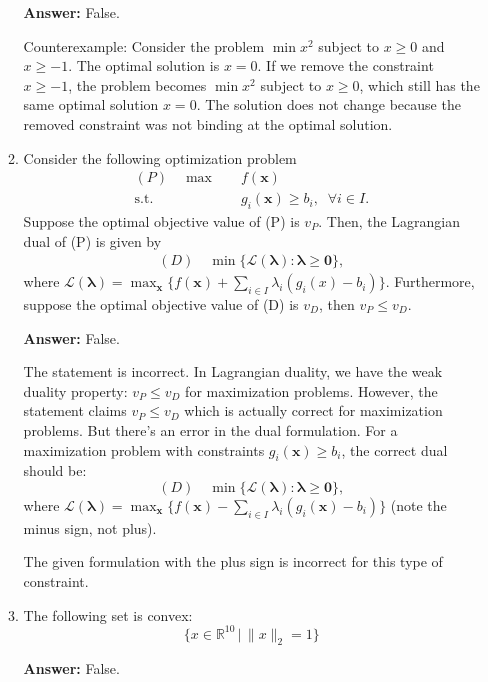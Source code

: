 \documentclass{article}
\def\x{\bm{x}}
\begin{document}
\begin{enumerate}
\begin{enumerate}
\textbf{Answer:} False.

Counterexample: Consider the problem $\min x^2$ subject to $x \geq 0$ and $x \geq -1$. The optimal solution is $x = 0$. If we remove the constraint $x \geq -1$, the problem becomes $\min x^2$ subject to $x \geq 0$, which still has the same optimal solution $x = 0$. The solution does not change because the removed constraint was not binding at the optimal solution.

\item Consider the following optimization problem
\begin{align*}
    (P)\quad \max \quad & f(\x) \\
    \text{s.t.}\quad & g_i(\x)\ge b_i, \;\; \forall i \in I.
\end{align*}
Suppose the optimal objective value of (P) is $v_P$. Then, the Lagrangian dual of (P) is given by
\begin{align}
    (D) \quad \min\{\mathcal{L}(\bm{\lambda}) : \bm{\lambda} \ge \bm{0}\},
\end{align}
where $\mathcal{L}(\bm{\lambda}) = \max_{\x}\{f(\x) + \sum_{i\in I}\lambda_i(g_i(x)-b_i)\}$. Furthermore, suppose the optimal objective value of (D) is $v_D$, then $v_P \le v_D$.

\textbf{Answer:} False.

The statement is incorrect. In Lagrangian duality, we have the weak duality property: $v_P \leq v_D$ for maximization problems. However, the statement claims $v_P \leq v_D$ which is actually correct for maximization problems. But there's an error in the dual formulation. For a maximization problem with constraints $g_i(\x) \geq b_i$, the correct dual should be:
$$(D) \quad \min\{\mathcal{L}(\bm{\lambda}) : \bm{\lambda} \geq \bm{0}\},$$
where $\mathcal{L}(\bm{\lambda}) = \max_{\x}\{f(\x) - \sum_{i\in I}\lambda_i(g_i(\x)-b_i)\}$ (note the minus sign, not plus).

The given formulation with the plus sign is incorrect for this type of constraint. 

\item The following set is convex:
$$\{x \in \mathbb{R}^{10} \,|\, \|x\|_2 = 1\}$$

\textbf{Answer:} False.


\end{enumerate}
\end{enumerate}
\end{document}
